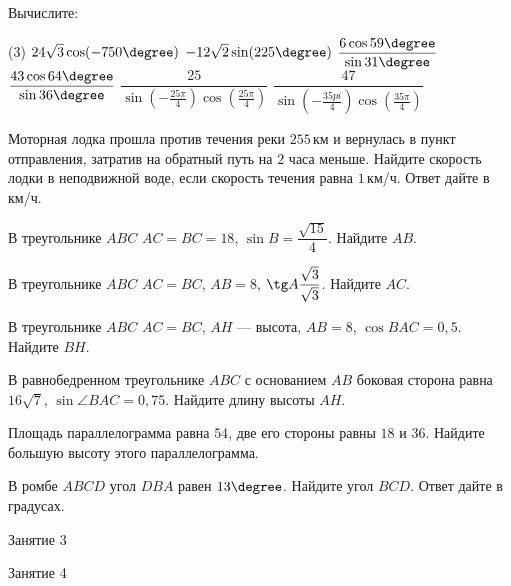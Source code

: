 \begin{homework}[number=1]
	\begin{listofex}
		\item Вычислите:
		\begin{tasks}(3)
			\task \( 24\sqrt{3}\cos(-750\degree) \)
			\task \( -12\sqrt{2}\sin(225\degree) \)
			\task \( \dfrac{6\cos59\degree}{\sin31\degree} \)
			\task \( \dfrac{43\cos64\degree}{\sin36\degree} \)
			\task \( \dfrac{25}{\sin\left( -\frac{25\pi}{4} \right)\cos\left( \frac{25\pi}{4} \right)} \)
			\task \( \dfrac{47}{\sin\left( -\frac{35pi}{4} \right)\cos\left( \frac{35\pi}{4} \right)} \)
		\end{tasks}
		\item Моторная лодка прошла против течения реки \( 255 \) км и вернулась в пункт отправления, затратив на обратный путь на \( 2 \) часа меньше. Найдите скорость лодки в неподвижной воде, если скорость течения равна \( 1 \) км/ч. Ответ дайте в км/ч.
		\item В треугольнике \( ABC \) \( AC=BC=18 \), \( \sin B=\dfrac{\sqrt{15}}{4} \). Найдите \( AB \).
		\item В треугольнике \( ABC \) \( AC=BC \), \( AB=8 \), \( \tg A\dfrac{\sqrt{3}}{\sqrt{3}} \).  Найдите \( AC \).
		\item В треугольнике \( ABC \) \( AC=BC \), \( AH \) --- высота, \( AB=8 \), \( \cos BAC=0,5 \). Найдите \( BH \).
		\item В равнобедренном треугольнике \( ABC \) с основанием \( AB \) боковая сторона равна \( 16\sqrt{7} \), \( \sin\angle BAC=0,75 \). Найдите длину высоты \( AH \).
		\item Площадь параллелограмма равна \( 54 \), две его стороны равны \( 18 \) и \( 36 \). Найдите большую высоту этого параллелограмма.
		\item В ромбе \( ABCD \) угол \( DBA \) равен \( 13\degree \). Найдите угол \( BCD \). Ответ дайте в градусах.
	\end{listofex}
\end{homework}

\begin{class}[number=3]
	\begin{listofex}
		\item Занятие 3 
	\end{listofex}
\end{class}

\begin{class}[number=4]
	\begin{listofex}
		\item Занятие 4
	\end{listofex}
\end{class}

